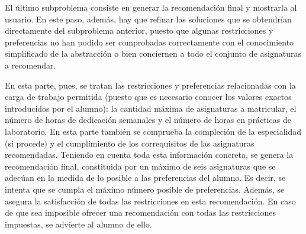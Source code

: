 El último subproblema consiste en generar la recomendación final y mostrarla 
al usuario. En este paso, además, hay que refinar las soluciones que se 
obtendrían directamente del subproblema anterior, puesto que algunas 
restricciones y preferencias no han podido ser comprobadas correctamente 
con el conocimiento simplificado de la abstracción o bien conciernen a todo 
el conjunto de asignaturas a recomendar. 

En esta parte, pues, se tratan las restricciones y preferencias relacionadas 
con la carga de trabajo permitida (puesto que es necesario conocer los valores 
exactos introducidos por el alumno): la cantidad máxima de asignaturas a 
matricular, el número de horas de dedicación semanales y el número de horas 
en prácticas de laboratorio. En esta parte también se comprueba la compleción 
de la especialidad (si procede) y el cumplimiento de los correquisitos de las 
asignaturas recomendadas. Teniendo en cuenta toda esta información concreta, 
se genera la recomendación final, constituida por un máximo de seis 
asignaturas que se adecúan en la medida de lo posible a las preferencias del 
alumno. Es decir, se intenta que se cumpla el máximo número posible de 
preferencias. Además, se asegura la satisfacción de todas las restricciones 
en esta recomendación. En caso de que sea imposible ofrecer una recomendación 
con todas las restricciones impuestas, se advierte al alumno de ello.





